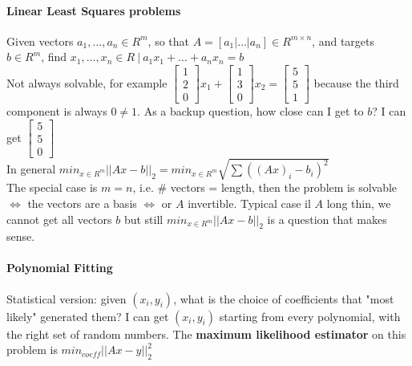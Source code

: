 \documentclass[10pt]{report}
\begin{document}
\paragraph{Linear Least Squares problems} Given vectors $a_1,\ldots,a_n\in R^m$, so that $A = [a_1|\ldots|a_n]\in R^{m\times n}$, and targets $b\in R^m$, find $x_1,\ldots,x_n\in R\:|\: a_1x_1 + \ldots + a_n x_n = b$\\
Not always solvable, for example $\left[\begin{array}{c}
1\\2\\0
\end{array}\right]x_1 + \left[\begin{array}{c}
1\\3\\0
\end{array}\right]x_2 = \left[\begin{array}{c}
5\\5\\1
\end{array}\right]$ because the third component is always $0 \neq 1$. As a backup question, how close can I get to $b$? I can get $\left[\begin{array}{c}
5\\5\\0
\end{array}\right]$\\
In general $min_{x\in R^m} ||Ax - b||_2 = min_{x\in R^m} \sqrt{\sum ((Ax)_i - b_i)^2}$\\
The special case is $m=n$, i.e. \# vectors = length, then the problem is solvable $\Leftrightarrow$ the vectors are a basis $\Leftrightarrow$ or $A$ invertible. Typical case il $A$ long thin, we cannot get all vectors $b$ but still $min_{x\in R^m} ||Ax - b||_2$ is a question that makes sense. 
\paragraph{Polynomial Fitting} Statistical version: given $(x_i, y_i)$, what is the choice of coefficients that "most likely" generated them? I can get $(x_i, y_i)$ starting from every polynomial, with the right set of random numbers. The \textbf{maximum likelihood estimator} on this problem is $min_{coeff}||Ax - y||_2^2$
\end{document}
